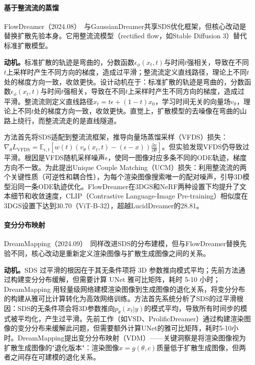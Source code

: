 \paragraph{基于整流流的蒸馏}

FlowDreamer（2024.08）~\cite{2408_05008}与GaussianDreamer共享SDS优化框架，但核心改动是替换扩散先验本身。它用整流流模型（rectified flow，如Stable Diffusion 3）替代标准扩散模型。

\textbf{动机。}标准扩散的轨迹是弯曲的，分数函数$\epsilon_\phi(x_t, t)$与时间$t$强相关，导致在不同$t$上采样时产生不同方向的梯度，造成过平滑；整流流定义直线路径，理论上不同$t$处的梯度方向一致，收敛更快。设计动机在于：标准扩散的轨迹是弯曲的，分数函数$\epsilon_\phi(x_t, t)$与时间$t$强相关，导致在不同$t$上采样时产生不同方向的梯度，造成过平滑。整流流则定义直线路径$x_t = t\epsilon + (1-t)x_0$，学习时间无关的向量场$v_\theta$，理论上不同$t$处的梯度方向一致，收敛更快。直觉上，扩散模型的去噪像在弯曲的山路上绕行，而整流流走的是直线隧道。

方法首先将SDS适配到整流流框架，推导向量场蒸馏采样（VFDS）损失：$\nabla_\theta L_{\text{VFDS}} = \mathbb{E}_{\epsilon,t}[w(t)(v_\theta(x_t,t) - (\epsilon - x))\frac{\partial x}{\partial \theta}]$。但实验发现VFDS仍导致过平滑。根因是VFDS随机采样噪声$\epsilon$，使同一图像对应多条不同的ODE轨迹，梯度方向不一致。为此提出Unique Couple Matching（UCM）损失：利用整流流的两个关键性质（可逆性和耦合性），为每个渲染图像搜索唯一的配对噪声，引导3D模型沿同一条ODE轨迹优化。FlowDreamer在3DGS和NeRF两种设置下均提升了文本细节和收敛速度，CLIP（Contrastive Language-Image Pre-training）相似度在3DGS设置下达到30.70（ViT-B-32），超越LucidDreamer的28.81。

\paragraph{变分分布映射}

DreamMapping（2024.09）~\cite{2409_05099}同样改进SDS的分布建模，但与FlowDreamer替换先验不同，核心改动是重新定义渲染图像与扩散生成图像之间的关系。

\textbf{动机。}SDS 过平滑的根因在于其无条件项将 3D 参数推向模式平均；先前方法通过构建变分分布缓解，但需要计算 UNet 雅可比矩阵，耗时 5-10 小时；DreamMapping 用轻量级网络建模渲染图像到生成图像的退化关系，将变分分布的构建从雅可比计算转化为高效网络训练。方法首先系统分析了SDS的过平滑根因：SDS的无条件项会将3D参数推向$p_\theta(x_t|y)$的模式平均，导致所有时间步的模式被平均化，产生过平滑。先前工作（如VSD、ProlificDreamer）通过构建渲染图像的变分分布来缓解此问题，但需要额外计算UNet的雅可比矩阵，耗时5-10小时。DreamMapping提出变分分布映射（VDM）——关键洞察是将渲染图像视为扩散生成图像的"退化版本"：渲染图像$x = g(\theta, c)$质量低于扩散生成图像，但两者之间存在可建模的退化关系。

